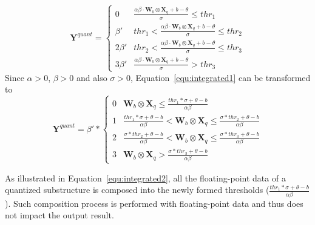 \documentclass[10pt,twocolumn,letterpaper]{article}
\begin{document}
\begin{equation}\label{equ:integrated1}
\textbf{Y}^{quant}=  \left\{
\begin{array}{rl}
0         &{     \frac{\alpha\beta \cdot\textbf{W}_b\otimes \textbf{X}_q+b -\theta}{\sigma}  \leq  thr_1} \\
\beta{'}      &{thr_1  <  \frac{\alpha\beta \cdot\textbf{W}_b\otimes \textbf{X}_q+b -\theta}{\sigma}  \leq  thr_2} \\
2\beta{'}     &{thr_2< \frac{\alpha\beta \cdot\textbf{W}_b\otimes \textbf{X}_q+b -\theta}{\sigma}  \leq  thr_3} \\
3\beta{'}     &{ \frac{\alpha\beta \cdot\textbf{W}_b\otimes \textbf{X}_q+b -\theta}{\sigma} > thr_3}
\end{array}
\right.
\end{equation}
Since $\alpha>0$, $\beta>0$ and also $\sigma>0$, Equation~\ref{equ:integrated1} can be transformed to
\begin{equation}\label{equ:integrated2}
\textbf{Y}^{quant}=  \beta{'}*\left\{
\begin{array}{rl}
0         &{                                          \textbf{W}_b\otimes \textbf{X}_q \leq   \frac{thr_1*\sigma+\theta-b}{\alpha\beta}} \\
1      &{\frac{thr_1*\sigma+\theta-b}{\alpha\beta}    <  \textbf{W}_b\otimes \textbf{X}_q  \leq  \frac{\sigma*thr_2+\theta-b}{\alpha\beta}} \\
2     &{\frac{\sigma*thr_2+\theta-b}{\alpha\beta} <  \textbf{W}_b\otimes \textbf{X}_q  \leq  \frac{\sigma*thr_3+\theta-b}{\alpha\beta}} \\
3     &{                                          \textbf{W}_b\otimes \textbf{X}_q > \frac{\sigma*thr_3+\theta-b}{\alpha\beta}}
\end{array}
\right.
\end{equation}

As illustrated in Equation~\ref{equ:integrated2}, all the floating-point data of a quantized substructure is composed into the newly formed thresholds (\eg $\frac{thr_1*\sigma+\theta-b}{\alpha\beta}$). Such composition process is performed with floating-point data and thus does not impact the output result.
\end{document}
